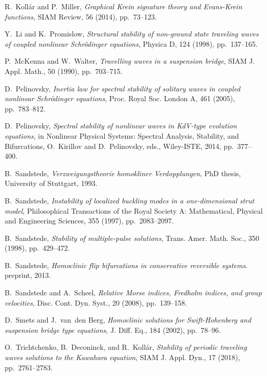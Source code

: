 \documentclass[review,onefignum,onetabnum]{siamart171218}
\begin{document}
\begin{thebibliography}{10}
{\sc R.~Koll\'ar and P.~Miller}, {\em Graphical {K}rein signature theory and
  {Evans-Krein} functions}, SIAM Review, 56 (2014), pp.~73--123.

{\sc Y.~Li and K.~Promislow}, {\em Structural stability of non-ground state
  traveling waves of coupled nonlinear {S}chr\"odinger equations}, Physica D,
  124 (1998), pp.~137--165.

{\sc P.~McKenna and W.~Walter}, {\em Travelling waves in a suspension bridge},
  {SIAM} J. Appl. Math., 50 (1990), pp.~703--715.

{\sc D.~Pelinovsky}, {\em Inertia law for spectral stability of solitary waves
  in coupled nonlinear {S}chr\"odinger equations}, Proc. Royal Soc. London A,
  461 (2005), pp.~783--812.

{\sc D.~Pelinovsky}, {\em Spectral stability of nonlinear waves in {KdV}-type
  evolution equations}, in Nonlinear Physical Systems: Spectral Analysis,
  Stability, and Bifurcations, O.~Kirillov and D.~Pelinovsky, eds., Wiley-ISTE,
  2014, pp.~377--400.

{\sc B.~Sandstede}, {\em Verzweigungstheorie homokliner Verdopplungen}, PhD
  thesis, University of Stuttgart, 1993.

{\sc B.~Sandstede}, {\em Instability of localized buckling modes in a
  one-dimensional strut model}, Philosophical Transactions of the Royal Society
  A: Mathematical, Physical and Engineering Sciences, 355 (1997),
  pp.~2083--2097.

{\sc B.~Sandstede}, {\em Stability of multiple-pulse solutions}, Trans. Amer.
  Math. Soc., 350 (1998), pp.~429--472.

{\sc B.~Sandstede}, {\em Homoclinic flip bifurcations in conservative
  reversible systems}.
\newblock preprint, 2013.

{\sc B.~Sandstede and A.~Scheel}, {\em Relative {M}orse indices, {F}redholm
  indices, and group velocities}, Disc. Cont. Dyn. Syst., 20 (2008),
  pp.~139--158.

{\sc D.~Smets and J.~van~den Berg}, {\em Homoclinic solutions for
  {S}wift-{H}ohenberg and suspension bridge type equations}, J. Diff. Eq., 184
  (2002), pp.~78--96.

{\sc O.~Trichtchenko, B.~Deconinck, and R.~Koll\'ar}, {\em Stability of
  periodic traveling waves solutions to the {K}awahara equation}, SIAM J. Appl.
  Dyn., 17 (2018), pp.~2761--2783.


\end{thebibliography}
\end{document}
